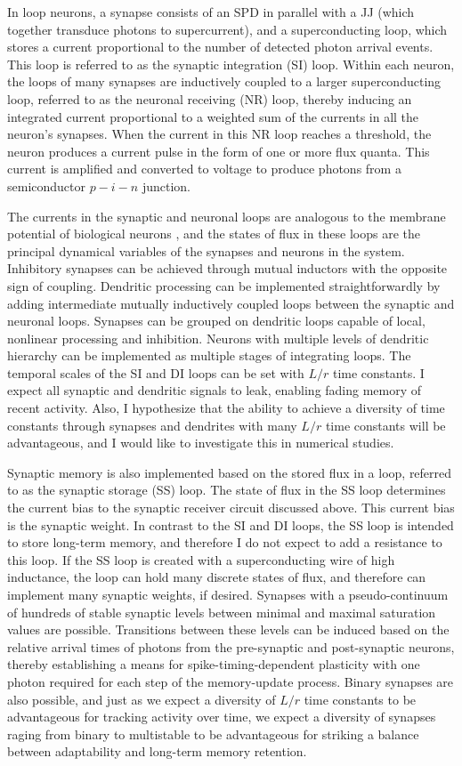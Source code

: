 \documentclass[twocolumn]{article}
\begin{document}
In loop neurons, a synapse consists of an SPD in parallel with a JJ (which together transduce photons to supercurrent), and a superconducting loop, which stores a current proportional to the number of detected photon arrival events. This loop is referred to as the synaptic integration (SI) loop. Within each neuron, the loops of many synapses are inductively coupled to a larger superconducting loop, referred to as the neuronal receiving (NR) loop, thereby inducing an integrated current proportional to a weighted sum of the currents in all the neuron's synapses. When the current in this NR loop reaches a threshold, the neuron produces a current pulse in the form of one or more flux quanta. This current is amplified and converted to voltage to produce photons from a semiconductor $p-i-n$ junction.

The currents in the synaptic and neuronal loops are analogous to the membrane potential of biological neurons \cite{daab2001,geki2002}, and the states of flux in these loops are the principal dynamical variables of the synapses and neurons in the system. Inhibitory synapses can be achieved through mutual inductors with the opposite sign of coupling. Dendritic processing can be implemented straightforwardly by adding intermediate mutually inductively coupled loops between the synaptic and neuronal loops. Synapses can be grouped on dendritic loops capable of local, nonlinear processing and inhibition. Neurons with multiple levels of dendritic hierarchy can be implemented as multiple stages of integrating loops. The temporal scales of the SI and DI loops can be set with $L/r$ time constants. I expect all synaptic and dendritic signals to leak, enabling fading memory of recent activity. Also, I hypothesize that the ability to achieve a diversity of time constants through synapses and dendrites with many $L/r$ time constants will be advantageous, and I would like to investigate this in numerical studies.

Synaptic memory is also implemented based on the stored flux in a loop, referred to as the synaptic storage (SS) loop. The state of flux in the SS loop determines the current bias to the synaptic receiver circuit discussed above. This current bias is the synaptic weight. In contrast to the SI and DI loops, the SS loop is intended to store long-term memory, and therefore I do not expect to add a resistance to this loop. If the SS loop is created with a superconducting wire of high inductance, the loop can hold many discrete states of flux, and therefore can implement many synaptic weights, if desired. Synapses with a pseudo-continuum of hundreds of stable synaptic levels between minimal and maximal saturation values are possible. Transitions between these levels can be induced based on the relative arrival times of photons from the pre-synaptic and post-synaptic neurons, thereby establishing a means for spike-timing-dependent plasticity with one photon required for each step of the memory-update process. Binary synapses are also possible, and just as we expect a diversity of $L/r$ time constants to be advantageous for tracking activity over time, we expect a diversity of synapses raging from binary to multistable to be advantageous for striking a balance between adaptability and long-term memory retention.
\end{document}
